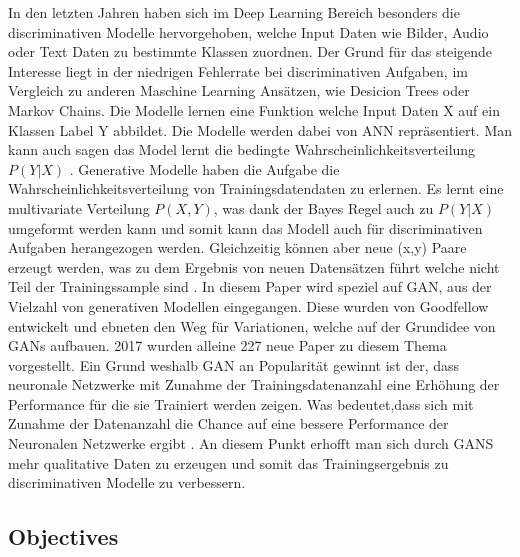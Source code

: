 \documentclass{llncs}
\begin{document}
In den letzten Jahren haben sich im Deep Learning Bereich besonders die discriminativen Modelle hervorgehoben, welche Input Daten wie Bilder, Audio oder Text Daten zu bestimmte Klassen zuordnen. Der Grund für das steigende Interesse liegt in der niedrigen Fehlerrate bei discriminativen Aufgaben, im Vergleich zu anderen Maschine Learning Ansätzen, wie Desicion Trees oder Markov Chains\cite{Grundlagen}. Die Modelle lernen eine Funktion welche Input Daten X auf ein Klassen Label Y abbildet. Die Modelle werden dabei von ANN repräsentiert. Man kann auch sagen das Model lernt die bedingte Wahrscheinlichkeitsverteilung $P(Y|X)$ \cite{discrim}. Generative Modelle haben die Aufgabe die Wahrscheinlichkeitsverteilung von Trainingsdatendaten zu erlernen. Es lernt eine multivariate Verteilung $P(X,Y)$, was dank der Bayes Regel auch zu $P(Y|X)$ umgeformt werden kann und somit kann das Modell auch für discriminativen Aufgaben herangezogen werden. Gleichzeitig können aber neue (x,y) Paare erzeugt werden, was zu dem Ergebnis von neuen Datensätzen führt welche nicht Teil der Trainingssample sind \cite{discrim}. In diesem Paper wird speziel auf GAN, aus der Vielzahl von generativen Modellen eingegangen. Diese wurden von Goodfellow\cite{goodfellow2014} entwickelt und ebneten den Weg für Variationen, welche auf der Grundidee von GANs aufbauen. 2017 wurden alleine 227 neue Paper zu diesem Thema vorgestellt. Ein Grund weshalb GAN an Popularität gewinnt ist der, dass neuronale Netzwerke mit Zunahme der Trainingsdatenanzahl eine Erhöhung der Performance für die sie Trainiert werden zeigen. Was bedeutet,dass sich mit Zunahme der Datenanzahl die Chance auf eine bessere Performance der Neuronalen Netzwerke ergibt \cite{data}. An diesem Punkt erhofft man sich durch GANS mehr qualitative Daten zu erzeugen und somit das Trainingsergebnis zu discriminativen Modelle zu verbessern. 

\subsection{Objectives}
\end{document}
